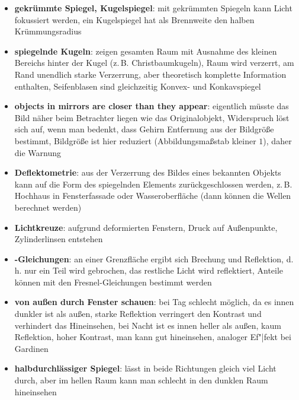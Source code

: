 \begin{itemize}
    \item
    \textbf{gekrümmte Spiegel, Kugelspiegel}:
    mit gekrümmten Spiegeln kann Licht fokussiert werden,
    ein Kugelspiegel hat als Brennweite den halben Krümmungsradius
    
    \item
    \textbf{spiegelnde Kugeln}:
    zeigen gesamten Raum mit Ausnahme des kleinen Bereichs hinter der Kugel
    (z.\,B. Christbaumkugeln), Raum wird verzerrt, am Rand unendlich starke
    Verzerrung, aber theoretisch komplette Information enthalten,
    Seifenblasen sind gleichzeitig Konvex- und Konkavspiegel
    
    \item
    \textbf{objects in mirrors are closer than they appear}:
    eigentlich müsste das Bild näher beim Betrachter liegen wie das
    Originalobjekt, Widerspruch löst sich auf, wenn man bedenkt, dass Gehirn
    Entfernung aus der Bildgröße bestimmt, Bildgröße ist hier reduziert
    (Abbildungsmaßstab kleiner $1$), daher die Warnung
    
    \item
    \textbf{Deflektometrie}:
    aus der Verzerrung des Bildes eines bekannten Objekts kann auf die Form
    des spiegelnden Elements zurückgeschlossen werden, z.\,B.
    Hochhaus in Fensterfassade oder Wasseroberfläche
    (dann können die Wellen berechnet werden)
    
    \item
    \textbf{Lichtkreuze}:
    aufgrund deformierten Fenstern, Druck auf Außenpunkte,
    Zylinderlinsen entstehen
\end{itemize}
\linie
\begin{itemize}
    \item
    \textbf{-Gleichungen}:
    an einer Grenzfläche ergibt sich Brechung und Reflektion,
    d.\,h. nur ein Teil wird gebrochen, das restliche Licht wird reflektiert,
    Anteile können mit den Fresnel-Gleichungen bestimmt werden
    
    \item
    \textbf{von außen durch Fenster schauen}:
    bei Tag schlecht möglich, da es innen dunkler ist als außen,
    starke Reflektion verringert den Kontrast und verhindert das Hineinsehen,
    bei Nacht ist es innen heller als außen, kaum Reflektion, hoher Kontrast,
    man kann gut hineinsehen,
    analoger Ef"|fekt bei Gardinen
    
    \item
    \textbf{halbdurchlässiger Spiegel}:
    lässt in beide Richtungen gleich viel Licht durch, aber im hellen Raum
    kann man schlecht in den dunklen Raum hineinsehen
\end{itemize}
